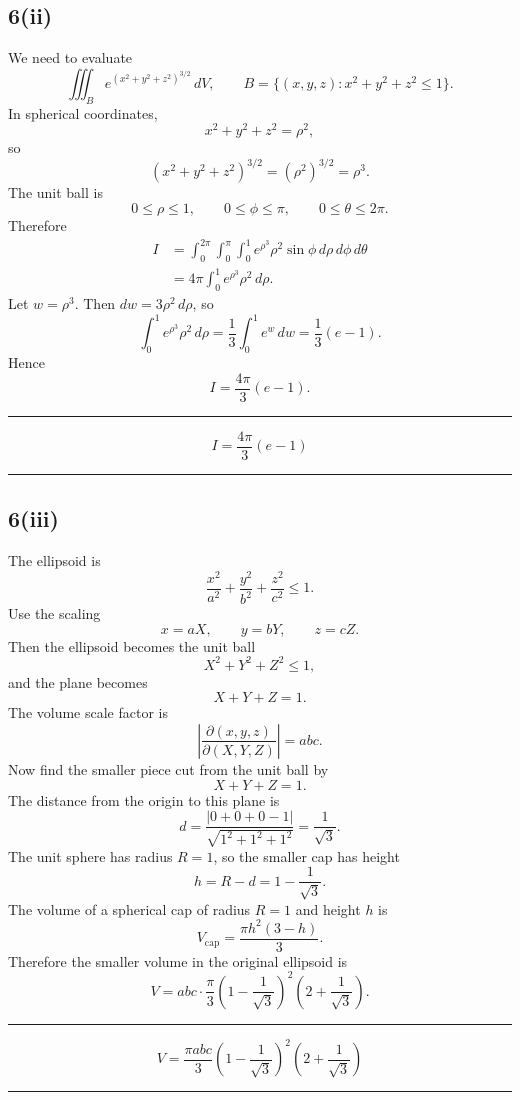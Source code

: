 \documentclass[11pt,a4paper]{article}
\newenvironment{resultbox}{\par\medskip\noindent\begin{minipage}{\linewidth}\hrule\smallskip}{\smallskip\hrule\end{minipage}\par\medskip}
\newcommand{\abs}[1]{\left|#1\right|}
\newcommand{\ans}[1]{\begin{resultbox}\[\boxed{#1}\]\end{resultbox}}
\begin{document}
\subsection*{6(ii)}
We need to evaluate
\[
\iiint_B e^{(x^2+y^2+z^2)^{3/2}}\,dV,
\qquad
B=\{(x,y,z):x^2+y^2+z^2\le1\}.
\]
In spherical coordinates,
\[
x^2+y^2+z^2=\rho^2,
\]
so
\[
(x^2+y^2+z^2)^{3/2}=(\rho^2)^{3/2}=\rho^3.
\]
The unit ball is
\[
0\le\rho\le1,
\qquad 0\le\phi\le\pi,
\qquad 0\le\theta\le2\pi.
\]
Therefore
\begin{align*}
I&=\int_0^{2\pi}\int_0^\pi\int_0^1e^{\rho^3}\rho^2\sin\phi\,d\rho\,d\phi\,d\theta\\
&=4\pi\int_0^1e^{\rho^3}\rho^2\,d\rho.
\end{align*}
Let \(w=\rho^3\). Then \(dw=3\rho^2\,d\rho\), so
\[
\int_0^1e^{\rho^3}\rho^2\,d\rho
=\frac13\int_0^1e^w\,dw
=\frac13(e-1).
\]
Hence
\[
I=\frac{4\pi}{3}(e-1).
\]
\ans{I=\frac{4\pi}{3}(e-1)}

\subsection*{6(iii)}
The ellipsoid is
\[
\frac{x^2}{a^2}+\frac{y^2}{b^2}+\frac{z^2}{c^2}\le1.
\]
Use the scaling
\[
x=aX,
\qquad y=bY,
\qquad z=cZ.
\]
Then the ellipsoid becomes the unit ball
\[
X^2+Y^2+Z^2\le1,
\]
and the plane becomes
\[
X+Y+Z=1.
\]
The volume scale factor is
\[
\abs{\frac{\partial(x,y,z)}{\partial(X,Y,Z)}}=abc.
\]
Now find the smaller piece cut from the unit ball by
\[
X+Y+Z=1.
\]
The distance from the origin to this plane is
\[
d=\frac{|0+0+0-1|}{\sqrt{1^2+1^2+1^2}}=\frac1{\sqrt3}.
\]
The unit sphere has radius \(R=1\), so the smaller cap has height
\[
h=R-d=1-\frac1{\sqrt3}.
\]
The volume of a spherical cap of radius \(R=1\) and height \(h\) is
\[
V_{\mathrm{cap}}=\frac{\pi h^2(3-h)}{3}.
\]
Therefore the smaller volume in the original ellipsoid is
\[
V=abc\cdot\frac{\pi}{3}\left(1-\frac1{\sqrt3}\right)^2\left(2+\frac1{\sqrt3}\right).
\]
\ans{V=\frac{\pi abc}{3}\left(1-\frac1{\sqrt3}\right)^2\left(2+\frac1{\sqrt3}\right)}
\end{document}
